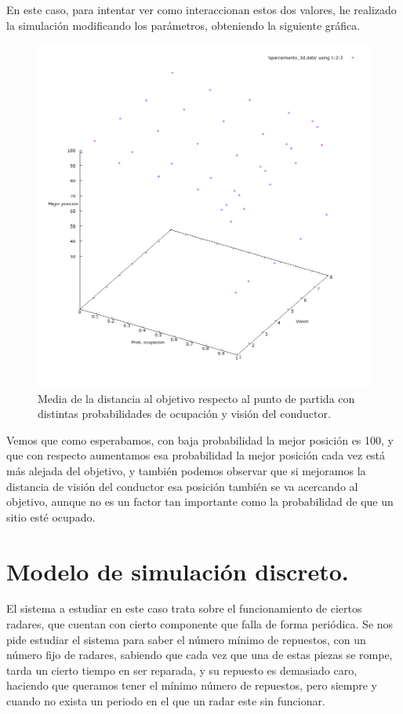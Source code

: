 \documentclass[12pt, spanish]{article}
\begin{document}
En este caso, para intentar ver como interaccionan estos dos valores, he realizado la simulación modificando los parámetros, obteniendo la siguiente gráfica.

\begin{figure}[H]
	\centering
	\includegraphics[scale = 0.55]{aparcamiento_3d.png}
	\caption{Media de la distancia al objetivo respecto al punto de partida con distintas probabilidades de ocupación y visión del conductor.}
	\label{fig:ej4}
\end{figure}

Vemos que como esperabamos, con baja probabilidad la mejor posición es 100, y que con respecto aumentamos esa probabilidad la mejor posición cada vez está más alejada del objetivo, y también podemos observar que si mejoramos la distancia de visión del conductor esa posición también se va acercando al objetivo, aunque no es un factor tan importante como la probabilidad de que un sitio esté ocupado.


\section{Modelo de simulación discreto.}

El sistema a estudiar en este caso trata sobre el funcionamiento de ciertos radares, que cuentan con cierto componente que falla de forma periódica. Se nos pide estudiar el sistema para saber el número mínimo de repuestos, con un número fijo de radares, sabiendo que cada vez que una de estas piezas se rompe, tarda un cierto tiempo en ser reparada, y su repuesto es demasiado caro, haciendo que queramos tener el mínimo número de repuestos, pero siempre y cuando no exista un periodo en el que un radar este sin funcionar.
\end{document}
